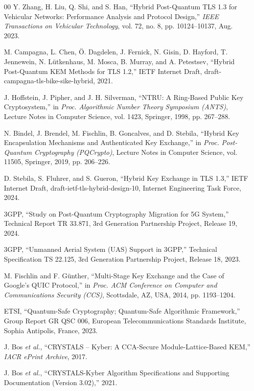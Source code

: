 \documentclass{ieeeaccess}
\begin{document}
\begin{thebibliography}{00}
Y. Zhang, H. Liu, Q. Shi, and S. Han, ``Hybrid Post-Quantum TLS 1.3 for Vehicular Networks: Performance Analysis and Protocol Design,'' \textit{IEEE Transactions on Vehicular Technology}, vol. 72, no. 8, pp. 10124--10137, Aug. 2023.

M. Campagna, L. Chen, \"{O}. Dagdelen, J. Fernick, N. Gisin, D. Hayford, T. Jennewein, N. L\"{u}tkenhaus, M. Mosca, B. Murray, and A. Petestsev, ``Hybrid Post-Quantum KEM Methods for TLS 1.2,'' IETF Internet Draft, draft-campagna-tls-bike-sike-hybrid, 2021.

J. Hoffstein, J. Pipher, and J. H. Silverman, ``NTRU: A Ring-Based Public Key Cryptosystem,'' in \textit{Proc. Algorithmic Number Theory Symposium (ANTS)}, Lecture Notes in Computer Science, vol. 1423, Springer, 1998, pp. 267--288.

N. Bindel, J. Brendel, M. Fischlin, B. Goncalves, and D. Stebila, ``Hybrid Key Encapsulation Mechanisms and Authenticated Key Exchange,'' in \textit{Proc. Post-Quantum Cryptography (PQCrypto)}, Lecture Notes in Computer Science, vol. 11505, Springer, 2019, pp. 206--226.

D. Stebila, S. Fluhrer, and S. Gueron, ``Hybrid Key Exchange in TLS 1.3,'' IETF Internet Draft, draft-ietf-tls-hybrid-design-10, Internet Engineering Task Force, 2024.

3GPP, ``Study on Post-Quantum Cryptography Migration for 5G System,'' Technical Report TR 33.871, 3rd Generation Partnership Project, Release 19, 2024.

3GPP, ``Unmanned Aerial System (UAS) Support in 3GPP,'' Technical Specification TS 22.125, 3rd Generation Partnership Project, Release 18, 2023.

M. Fischlin and F. G\"{u}nther, ``Multi-Stage Key Exchange and the Case of Google's QUIC Protocol,'' in \textit{Proc. ACM Conference on Computer and Communications Security (CCS)}, Scottsdale, AZ, USA, 2014, pp. 1193--1204.

ETSI, ``Quantum-Safe Cryptography; Quantum-Safe Algorithmic Framework,'' Group Report GR QSC 006, European Telecommunications Standards Institute, Sophia Antipolis, France, 2023.

J. Bos \textit{et al.}, ``CRYSTALS -- Kyber: A CCA-Secure Module-Lattice-Based KEM,'' \textit{IACR ePrint Archive}, 2017.

J. Bos \textit{et al.}, ``CRYSTALS-Kyber Algorithm Specifications and Supporting Documentation (Version 3.02),'' 2021.


\end{thebibliography}
\end{document}
